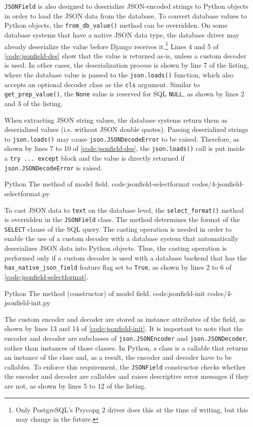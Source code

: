 \verb|JSONField| is also designed to deserialize JSON-encoded strings to Python
objects in order to load the JSON data from the database. To convert database
values to Python objects, the \verb|from_db_value()| method can be overridden.
On some database systems that have a native JSON data type, the database driver
may already deserialize the value before Django receives it.\footnote{Only
PostgreSQL's Psycopg 2 driver does this at the time of writing, but this may
change in the future.} Lines 4 and 5 of \autoref{code:jsonfield-des} show that
the value is returned as-is, unless a custom decoder is used. In other cases,
the deserialization process is shown by line 7 of the listing, where
the database value is passed to the \verb|json.loads()| function, which also
accepts an optional decoder class as the \verb|cls| argument. Similar to
\verb|get_prep_value()|, the \verb|None| value is reserved for SQL \verb|NULL|,
as shown by lines 2 and 3 of the listing.

When extracting JSON string values, the database systems return them as
deserialized values (i.e. without JSON double quotes). Passing deserialized
strings to \verb|json.loads()| may cause \verb|json.JSONDecodeError| to be
raised. Therefore, as shown by lines 7 to 10 of \autoref{code:jsonfield-des},
the \verb|json.loads()| call is put inside a \verb|try ... except| block and
the value is directly returned if \verb|json.JSONDecodeError| is raised.

\listing
{Python}
{The  method of  model field.}
{code:jsonfield-selectformat}
{codes/4-jsonfield-selectformat.py}

To cast JSON data to \verb|text| on the database level, the
\verb|select_format()| method is overridden in the \verb|JSONField| class. The
method determines the format of the \verb|SELECT| clause of the SQL query. The
casting operation is needed in order to enable the use of a custom decoder with
a database system that automatically deserializes JSON data into Python
objects. Thus, the casting operation is performed only if a custom decoder is
used with a database backend that has the \verb|has_native_json_field| feature
flag set to \verb|True|, as shown by lines 2 to 6 of
\autoref{code:jsonfield-selectformat}.

\listing
{Python}
{The  method (constructor) of 
model field.}
{code:jsonfield-init}
{codes/4-jsonfield-init.py}

The custom encoder and decoder are stored as instance attributes of the field,
as shown by lines 13 and 14 of \autoref{code:jsonfield-init}. It is important
to note that the encoder and decoder are subclasses of \verb|json.JSONEncoder|
and \verb|json.JSONDecoder|, rather than instances of those classes. In Python,
a class is a callable that returns an instance of the class and, as a result,
the encoder and decoder have to be callables. To enforce this requirement, the
\verb|JSONField| constructor checks whether the encoder and decoder are
callables and raises descriptive error messages if they are not, as shown by
lines 5 to 12 of the listing.

